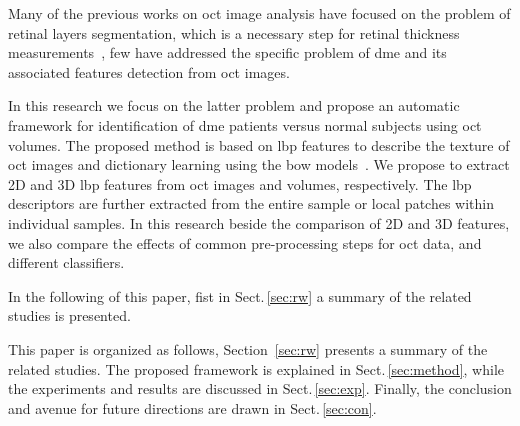 \begin{changebar}
Many of the previous works on \ac{oct} image analysis have focused on the
problem of retinal layers segmentation, which is a necessary step for retinal
thickness measurements~\cite{Chiu2010,Kafieh2013},  few have addressed the
specific problem of \ac{dme} and its associated features detection from
\ac{oct} images.
\end{changebar}

In this research we focus on the latter problem and propose an automatic framework for identification of \ac{dme} patients versus normal subjects using \ac{oct} volumes.
The proposed method is based on \ac{lbp} features to describe the texture of \ac{oct} images and dictionary learning using the \ac{bow} models~\cite{Sivic2003}.
We propose to extract 2D and 3D \ac{lbp} features from \ac{oct} images and volumes, respectively.
The \ac{lbp} descriptors are further extracted from the entire sample or local patches within individual samples.
In this research beside the comparison of 2D and 3D features, we also compare the effects of common pre-processing steps for \ac{oct} data, and different classifiers.

In the following of this paper, fist in Sect.\,\ref{sec:rw} a summary of the related studies is presented.

This paper is organized as follows, Section~\ref{sec:rw} presents a summary of the related studies.
The proposed framework is explained in Sect.\,\ref{sec:method}, while the experiments and results are discussed in Sect.\,\ref{sec:exp}.
Finally, the conclusion and avenue for future directions are drawn in Sect.\,\ref{sec:con}.



